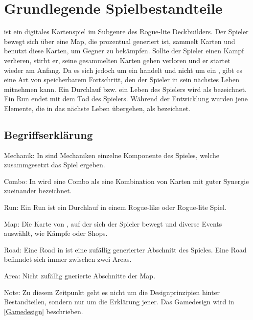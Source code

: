 
\section{Grundlegende Spielbestandteile}\label{sec:grundlegenste-regeln}

\renewcommand{\kapitelautor}{Autor: Philip Jankovic}






%
\FF ist ein digitales Kartenspiel im Subgenre des Rogue-lite Deckbuilders.
Der Spieler bewegt sich über eine Map, die prozentual generiert ist, sammelt Karten und benutzt diese Karten,
um Gegner zu bekämpfen. Sollte der Spieler einen Kampf verlieren, stirbt er, seine gesammelten Karten
gehen verloren und er startet wieder am Anfang. Da es sich jedoch um ein  handelt und nicht um ein ,
gibt es eine Art von speicherbarem Fortschritt, den der Spieler in sein nächstes Leben mitnehmen kann.
Ein Durchlauf bzw. ein Leben des Spielers wird als  bezeichnet. Ein Run endet mit dem Tod des Spielers.
Während der Entwicklung wurden jene Elemente, die in das nächste Leben übergehen, als  bezeichnet.


\subsection{Begriffserklärung}\label{rogue_lite_elemente}
Mechanik: In \FF sind Mechaniken einzelne Komponente des Spieles, welche zusammgesetzt das Spiel ergeben.

Combo: In \FF wird eine Combo als eine Kombination von Karten mit guter Synergie zueinander bezeichnet.

Run: Ein Run ist ein Durchlauf in einem Rogue-like oder Rogue-lite Spiel. 

Map: Die Karte von \FF, auf der sich der Spieler bewegt und diverse Events auswählt, wie \zB Kämpfe oder Shops.

Road: Eine Road in \FF ist eine zufällig generierter Abschnitt des Spieles. Eine Road befinndet sich immer zwischen zwei Areas.

Area: Nicht zufällig gnerierte Abschnitte der \FF Map.

\begin{infoBox}
    Note: Zu diesem Zeitpunkt geht es nicht um die Designprinzipien hinter Bestandteilen,
    sondern nur um die Erklärung jener. Das Gamedesign wird in \ref{Gamedesign} beschrieben.
\end{infoBox}


